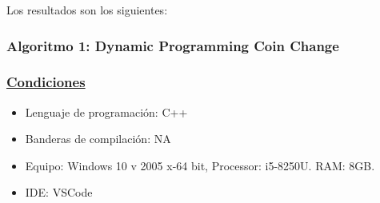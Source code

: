 \documentclass[12pt,letterpaper, titlepage, onecolumn]{article}
\begin{document}
	\par Los resultados son los siguientes:
	\pagebreak

	\subsubsection{Algoritmo 1: Dynamic Programming Coin Change}
		\subsubsection{\underline{Condiciones}}
			\begin{itemize}
				\item Lenguaje de programación: C++
				\item Banderas de compilación: NA
				\item Equipo: Windows 10 v 2005 x-64 bit, Processor: i5-8250U. RAM: 8GB.
				\item IDE: VSCode\\
			\end{itemize}
\end{document}
